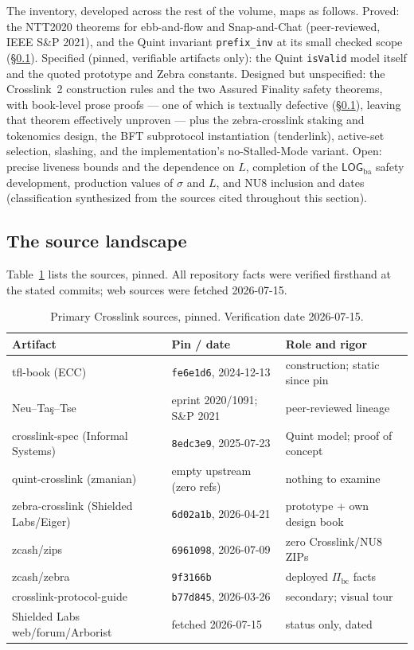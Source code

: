\documentclass[11pt,a4paper]{article}
\theoremstyle{definition}
\begin{document}
The inventory, developed across the rest of the volume, maps as
follows. Proved: the NTT2020 theorems for ebb-and-flow and Snap-and-Chat
(peer-reviewed, IEEE S\&P 2021), and the Quint invariant
\texttt{prefix\_inv} at its small checked scope
(\S\ref{sec:xl-sources}). Specified (pinned, verifiable artifacts only):
the Quint \texttt{isValid} model itself and the quoted prototype and
Zebra constants. Designed but unspecified: the Crosslink~2 construction
rules and the two Assured Finality safety theorems, with book-level
prose proofs --- one of which is textually defective
(\S\ref{sec:xl-sources}), leaving that theorem effectively unproven ---
plus the zebra-crosslink staking and tokenomics design, the BFT
subprotocol instantiation (tenderlink), active-set selection, slashing,
and the implementation's no-Stalled-Mode variant. Open: precise liveness bounds and the dependence on $L$,
completion of the $\mathsf{LOG}_{\mathrm{ba}}$ safety development,
production values of $\sigma$ and $L$, and NU8 inclusion and dates
(classification synthesized from the sources cited throughout this
section).

\subsection{The source landscape}\label{sec:xl-sources}

Table~\ref{tab:xl-sources} lists the sources, pinned. All repository
facts were verified firsthand at the stated commits; web sources were
fetched 2026-07-15.

\begin{table}[htbp]
\centering
\small
\begin{tabular}{@{}lll@{}}
\toprule
Artifact & Pin / date & Role and rigor \\
\midrule
tfl-book (ECC)
  & \texttt{fe6e1d6}, 2024-12-13 & construction; static since pin \\
Neu--Ta\c{s}--Tse
  & eprint 2020/1091; S\&P 2021 & peer-reviewed lineage \\
crosslink-spec (Informal Systems)
  & \texttt{8edc3e9}, 2025-07-23 & Quint model; proof of concept \\
quint-crosslink (zmanian)
  & empty upstream (zero refs)  & nothing to examine \\
zebra-crosslink (Shielded Labs/Eiger)
  & \texttt{6d02a1b}, 2026-04-21 & prototype + own design book \\
zcash/zips
  & \texttt{6961098}, 2026-07-09 & zero Crosslink/NU8 ZIPs \\
zcash/zebra
  & \texttt{9f3166b}             & deployed $\Pi_{\mathrm{bc}}$ facts \\
crosslink-protocol-guide
  & \texttt{b77d845}, 2026-03-26 & secondary; visual tour \\
Shielded Labs web/forum/Arborist
  & fetched 2026-07-15           & status only, dated \\
\bottomrule
\end{tabular}
\caption{Primary Crosslink sources, pinned. Verification date
2026-07-15.}
\label{tab:xl-sources}
\end{table}
\end{document}
